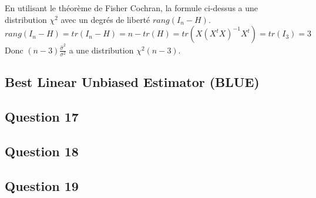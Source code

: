 \documentclass[]{book}
\theoremstyle{definition}
\begin{document}
En utilisant le th\'eor\`eme de Fisher Cochran, la formule ci-dessus a une distribution $\chi^2$ avec un degr\'es de libert\'e $rang(I_n-H)$.
$$
rang(I_n - H) = tr(I_n -H) = n - tr(H) = tr(X(X^tX)^{-1}X^t) = tr(I_3) = 3
$$
Donc 
$(n-3)\frac{\hat{\sigma}^2}{\sigma^2}$ a une distribution $\chi^2(n-3)$.


\subsection*{Best Linear Unbiased Estimator (BLUE)}

\subsection*{Question 17}

\subsection*{Question 18}

\subsection*{Question 19}
\end{document}
